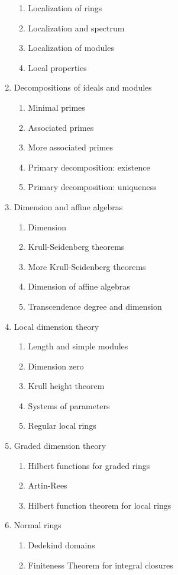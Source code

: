 \documentclass[12pt]{amsart}
\begin{document}
\begin{multicols}{2}
\begin{enumerate}
\begin{enumerate}[resume, label=\theenumi.\arabic*.]
\item Localization of rings
\item Localization and spectrum
\item Localization of modules
\item Local properties
\end{enumerate}
\columnbreak
\item Decompositions of ideals and modules
\begin{enumerate}[resume, label=\theenumi.\arabic*.]
\item Minimal primes
\item Associated primes
\item More associated primes
\item Primary decomposition: existence
\item Primary decomposition: uniqueness
\end{enumerate}
\item Dimension and affine algebras
\begin{enumerate}[resume, label=\theenumi.\arabic*.]
\item Dimension
\item Krull-Seidenberg theorems
\item More Krull-Seidenberg theorems
\item Dimension of affine algebras
\item Transcendence degree and dimension
\end{enumerate}
\item Local dimension theory
\begin{enumerate}[resume, label=\theenumi.\arabic*.]
\item Length and simple modules
\item Dimension zero
\item Krull height theorem
\item Systems of parameters
\item Regular local rings
\end{enumerate}
\item Graded dimension theory
\begin{enumerate}[resume, label=\theenumi.\arabic*.]
\item Hilbert functions for graded rings
\item Artin-Rees
\item Hilbert function theorem for local rings
\end{enumerate}
\item Normal rings
\begin{enumerate}[resume, label=\theenumi.\arabic*.]
\item Dedekind domains
\item Finiteness Theorem for integral closures
\end{enumerate}
\end{enumerate}
\end{multicols}
\end{document}
